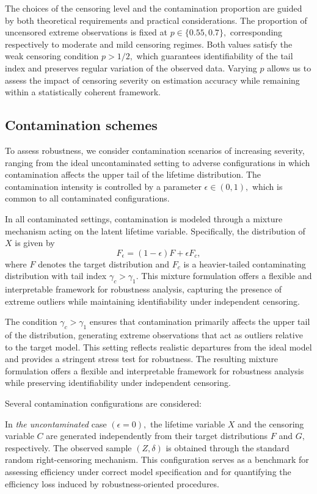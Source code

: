 \documentclass[reqno,openbib,runningheads,a4paper,12pt]{amsart}%
\begin{document}
\noindent The choices of the censoring level and the contamination proportion
are guided by both theoretical requirements and practical considerations. The
proportion of uncensored extreme observations is fixed at $p\in\{0.55,0.7\},$
corresponding respectively to moderate and mild censoring regimes. Both values
satisfy the weak censoring condition $p>1/2,$ which guarantees identifiability
of the tail index and preserves regular variation of the observed data.
Varying $p$ allows us to assess the impact of censoring severity on estimation
accuracy while remaining within a statistically coherent framework.

\subsection{Contamination schemes}

\noindent To assess robustness, we consider contamination scenarios of
increasing severity, ranging from the ideal uncontaminated setting to adverse
configurations in which contamination affects the upper tail of the lifetime
distribution. The contamination intensity is controlled by a parameter
$\epsilon\in(0,1),$ which is common to all contaminated
configurations.\smallskip

\noindent In all contaminated settings, contamination is modeled through a
mixture mechanism acting on the latent lifetime variable. Specifically, the
distribution of $X$ is given by
\[
F_{\epsilon}=(1-\epsilon)F+\epsilon F_{c},
\]
where $F$ denotes the target distribution and $F_{c}$ is a heavier-tailed
contaminating distribution with tail index $\gamma_{c}>\gamma_{1}.$ This
mixture formulation offers a flexible and interpretable framework for
robustness analysis, capturing the presence of extreme outliers while
maintaining identifiability under independent censoring.\smallskip

\noindent The condition $\gamma_{c}>\gamma_{1}$ ensures that contamination
primarily affects the upper tail of the distribution, generating extreme
observations that act as outliers relative to the target model. This setting
reflects realistic departures from the ideal model and provides a stringent
stress test for robustness. The resulting mixture formulation offers a
flexible and interpretable framework for robustness analysis while preserving
identifiability under independent censoring.\smallskip

\noindent Several contamination configurations are considered:\smallskip

\noindent In \textit{the uncontaminated} case $(\epsilon=0),$ the lifetime
variable $X$ and the censoring variable $C$ are generated independently from
their target distributions $F$ and $G,$ respectively. The observed sample
$(Z,\delta)$ is obtained through the standard random right-censoring
mechanism. This configuration serves as a benchmark for assessing efficiency
under correct model specification and for quantifying the efficiency loss
induced by robustness-oriented procedures.\smallskip
\end{document}
